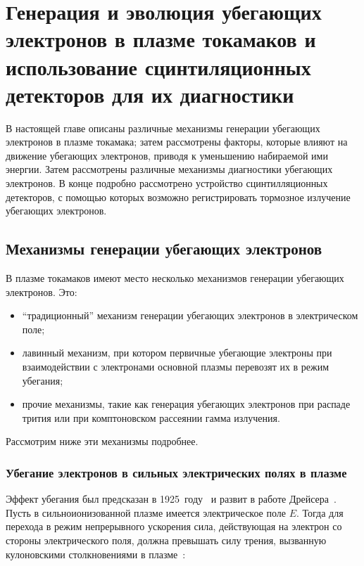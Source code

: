 

\chapter{Генерация и эволюция убегающих электронов в плазме токамаков и использование сцинтиляционных детекторов для их диагностики}
\label{sec:stateOfArt}

В настоящей главе описаны различные механизмы генерации убегающих электронов в плазме токамака; затем рассмотрены факторы, которые влияют на движение убегающих электронов, приводя к уменьшению набираемой ими энергии. Затем рассмотрены различные механизмы диагностики убегающих электронов. В конце подробно рассмотрено устройство сцинтилляционных детекторов, с помощью которых возможно регистрировать тормозное излучение убегающих электронов. 


\section{Механизмы генерации убегающих электронов}
\label{sec:electronsGeneration}

В плазме токамаков имеют место несколько механизмов генерации убегающих электронов. Это:

\begin{itemize}
  \item ``традиционный'' механизм генерации убегающих электронов в электрическом поле;
  \item лавинный механизм, при котором первичные убегающие электроны при взаимодействии с электронами основной плазмы перевозят их в режим убегания;
  \item прочие механизмы, такие как генерация убегающих электронов при распаде трития или при комптоновском рассеянии гамма излучения.
\end{itemize}

Рассмотрим ниже эти механизмы подробнее.


\subsection{Убегание электронов в сильных электрических полях в плазме}

Эффект убегания был предсказан в 1925~году~\cite{Wilson1925} и развит в работе Дрейсера~\cite{Dreicer1959}. Пусть в сильноионизованной плазме имеется электрическое поле $E$. Тогда для перехода в режим непрерывного ускорения сила, действующая на электрон со стороны электрического поля, должна превышать силу трения, вызванную кулоновскими столкновениями в плазме~\cite{Wesson2004}:

